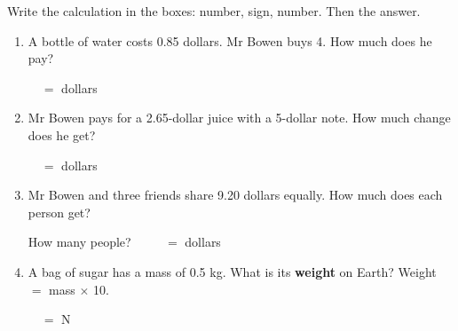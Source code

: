 \documentclass[12pt,a4paper]{article}
\newif\iffr
\newcommand{\fr}[1]{\unskip\iffr\par\vspace{1pt}\noindent{\small\itshape\color{black!60}#1}\par\fi}
\newcommand{\nbox}{\ \fbox{\rule{0pt}{1.05em}\rule{1.0em}{0pt}}\ }
\begin{document}
\noindent Write the calculation in the boxes: number, sign, number. Then the answer.
\fr{\'Ecris le calcul~: un nombre, un signe dans la case, un nombre. Puis le
r\'esultat.}

\begin{enumerate}[label=(\alph*), itemsep=8pt]
  \item A bottle of water costs 0.85 dollars. Mr Bowen buys 4. How much does he pay?
        \fr{Une bouteille d'eau co\^ute 0.85 dollar. Mr Bowen en ach\`ete 4. Combien paie-t-il~?}
        \par\vspace{6pt}\hspace*{1.6em}\blank[2.0cm] \nbox \blank[1.6cm] $=$
        \blank[2.2cm] dollars
  \item Mr Bowen pays for a 2.65-dollar juice with a 5-dollar note. How much change
        does he get?
        \fr{Mr Bowen paie un jus de fruits \`a 2.65 dollars avec un billet de 5
        dollars. Combien de monnaie (\eng{change}) lui rend-on~?}
        \par\vspace{6pt}\hspace*{1.6em}\blank[2.0cm] \nbox \blank[1.6cm] $=$
        \blank[2.2cm] dollars
  \item Mr Bowen and three friends share 9.20 dollars equally. How much does each
        person get?
        \fr{Mr Bowen et trois amis se partagent \'equitablement (\eng{share
        equally}) 9.20 dollars. Combien chacun re\c{c}oit-il~?}
        \par\vspace{6pt}\hspace*{1.6em}How many people? \nbox \hfill
        \blank[2.0cm] \nbox \blank[1.6cm] $=$ \blank[2.2cm] dollars
  \item A bag of sugar has a mass of 0.5 kg. What is its \textbf{weight} on Earth?
        Weight $=$ mass $\times$ 10.
        \fr{Un sac de sucre a une masse de 0.5 kg. Quel est son poids (\eng{weight}) sur Terre~?}
        \par\vspace{6pt}\hspace*{1.6em}\blank[2.0cm] \nbox \blank[1.6cm] $=$
        \blank[2.2cm] N
\end{enumerate}

\iffr\clearpage\fi
{}
\end{document}
